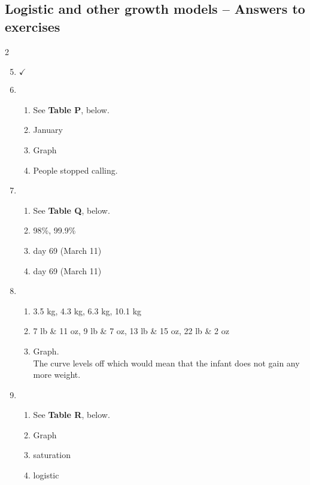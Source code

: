 \subsection {Logistic and other growth models -- Answers to exercises} %

\begin{multicols} {2}
\begin{enumerate}
\setcounter{enumi}{4}

\item %
$\checkmark$

\item %
\begin{enumerate}
\item See \textbf{Table P}, below.
\item January
\item Graph
\item People stopped calling.
\end{enumerate}

\item %
\begin{enumerate}
\item See \textbf{Table Q}, below.
\item 98\%, 99.9\%
\item day 69 (March 11)
\item day 69 (March 11)
\end{enumerate}

\item %
\begin{enumerate}
\item 3.5 kg, 4.3 kg, 6.3 kg, 10.1 kg
\item 7 lb \& 11 oz, 9 lb \& 7 oz, 13 lb \& 15 oz, 22 lb \& 2 oz
\item Graph. \\ The curve levels off which would mean that the infant does not gain any more weight.
\end{enumerate}

\item%
\begin{enumerate}
\item See \textbf{Table R}, below.
\item Graph
\item saturation
\item logistic
\end{enumerate}



\end{enumerate}
\end{multicols}

